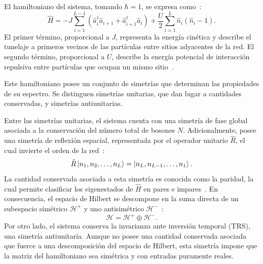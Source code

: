 \documentclass[10pt,a4paper]{article}
\begin{document}
El hamiltoniano del sistema, tomando $\hbar=1$, se expresa como~\cite{Zhang2010}:
\begin{equation}\label{eq:H:BH}
    \hat{H} = -J \sum_{i=1}^{L-1} \left(\hat{a}_i^{\dagger}\hat{a}_{i+1} + \hat{a}_{i+1}^{\dagger}\hat{a}_i\right) + \frac{U}{2}\sum_{i=1}^{L}\hat{n}_i(\hat{n}_i - 1).
\end{equation}
El primer término, proporcional a $J$, representa la energía cinética y describe el tunelaje a primeros vecinos de las partículas entre sitios adyacentes de la red. El segundo término, proporcional a $U$, describe la energía potencial de interacción repulsiva entre partículas que ocupan un mismo sitio~\cite{Zhang2010}.

Este hamiltoniano posee un conjunto de simetrías que determinan las propiedades de su espectro. Se distinguen simetrías unitarias, que dan lugar a cantidades conservadas, y simetrías antiunitarias.

Entre las simetrías unitarias, el sistema cuenta con una simetría de fase global asociada a la conservación del número total de bosones $N$. Adicionalmente, posee una simetría de reflexión espacial, representada por el operador unitario $\hat{R}$,
  el cual invierte el orden de la red~\cite{delacruz2020quantum}:
\begin{equation}
    \hat{R} \ket{n_1,n_2,\dots,n_L} = \ket{n_L,n_{L-1},\dots,n_1}.
\end{equation}
La cantidad conservada asociada a esta simetría es conocida como la paridad, la cual permite clasificar los eigenestados de $\hat{H}$ en pares e impares~\cite{Zhang2010}. En consecuencia, el espacio de Hilbert se descompone en la suma directa de un subespacio simétrico $\mathcal{H}^{+}$ y uno antisimétrico $\mathcal{H}^{-}$~\cite{Pausch2022}:
\begin{equation}\label{eq:sectors:BH}
    \mathcal{H} = \mathcal{H}^{+} \oplus \mathcal{H}^{-}.
\end{equation}
Por otro lado, el sistema conserva la invarianza ante inversión temporal (TRS), una simetría antiunitaria. Aunque no posee una cantidad conservada asociada que fuerce a una descomposición del espacio de Hilbert,
  esta simetría impone que la matriz del hamiltoniano sea simétrica y con entradas puramente reales.
\end{document}
